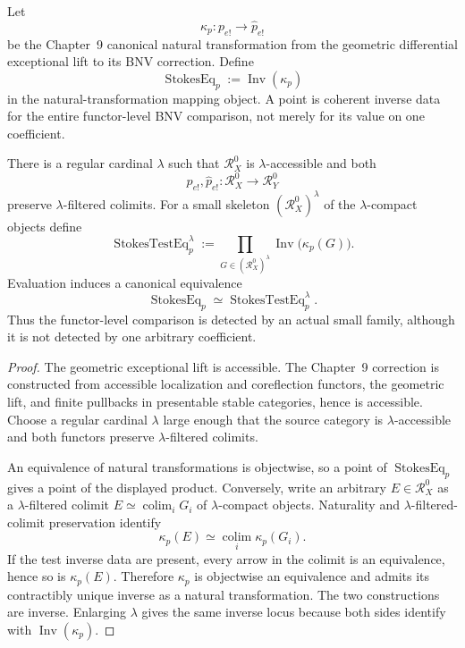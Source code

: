 \begin{definition}
\label{def:prequantum-bnv-stokes-inverse-locus}
Let
\[
\kappa_p:p_{e!}\longrightarrow\widehat p_{e!}
\]
be the Chapter~9 canonical natural transformation from the geometric differential
exceptional lift to its BNV correction.  Define
\[
\boxed{
\operatorname{StokesEq}_{p}
:=
\operatorname{Inv}(\kappa_p)
}
\]
in the natural-transformation mapping object.  A point is coherent inverse data for
the entire functor-level BNV comparison, not merely for its value on one
coefficient.
\end{definition}

\begin{theorem}
\label{thm:prequantum-bnv-small-detection}
There is a regular cardinal $\lambda$ such that $\mathcal R_X^0$ is
$\lambda$-accessible and both
\[
p_{e!},\widehat p_{e!}:\mathcal R_X^0\longrightarrow\mathcal R_Y^0
\]
preserve $\lambda$-filtered colimits.  For a small skeleton
$(\mathcal R_X^0)^\lambda$ of the $\lambda$-compact objects define
\[
\boxed{
\operatorname{StokesTestEq}_p^\lambda
:=
\prod_{G\in(\mathcal R_X^0)^\lambda}
\operatorname{Inv}\bigl(\kappa_p(G)\bigr).
}
\]
Evaluation induces a canonical equivalence
\[
\boxed{
\operatorname{StokesEq}_p
\simeq
\operatorname{StokesTestEq}_p^\lambda.
}
\]
Thus the functor-level comparison is detected by an actual small family, although
it is not detected by one arbitrary coefficient.
\end{theorem}

\begin{proof}
The geometric exceptional lift is accessible.  The Chapter~9 correction is
constructed from accessible localization and coreflection functors, the geometric
lift, and finite pullbacks in presentable stable categories, hence is accessible.
Choose a regular cardinal $\lambda$ large enough that the source category is
$\lambda$-accessible and both functors preserve $\lambda$-filtered colimits.

An equivalence of natural transformations is objectwise, so a point of
$\operatorname{StokesEq}_p$ gives a point of the displayed product.  Conversely,
write an arbitrary $E\in\mathcal R_X^0$ as a $\lambda$-filtered colimit
$E\simeq\operatorname*{colim}_iG_i$ of $\lambda$-compact objects.  Naturality and
$\lambda$-filtered-colimit preservation identify
\[
\kappa_p(E)
\simeq
\operatorname*{colim}_i\kappa_p(G_i).
\]
If the test inverse data are present, every arrow in the colimit is an
equivalence, hence so is $\kappa_p(E)$.  Therefore $\kappa_p$ is objectwise an
equivalence and admits its contractibly unique inverse as a natural
transformation.  The two constructions are inverse.  Enlarging $\lambda$ gives
the same inverse locus because both sides identify with
$\operatorname{Inv}(\kappa_p)$.
\end{proof}

